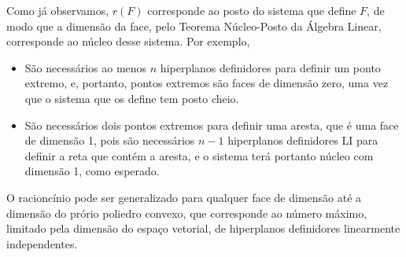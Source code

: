 Como já observamos, $r(F)$ corresponde ao posto do sistema
que define $F$, de modo que a dimensão da face, pelo Teorema Núcleo-Posto
da Álgebra Linear, corresponde ao núcleo desse sistema. Por exemplo,

\begin{itemize}
	\item São necessários ao menos $n$ hiperplanos definidores para
	  definir um ponto extremo, e, portanto, pontos extremos são
	  faces de dimensão zero, uma vez que o sistema que os define
	  tem posto cheio.

	\item São necessários dois pontos extremos para definir uma aresta,
	  que é uma face de dimensão 1, pois são necessários $n-1$ hiperplanos
	  definidores LI para definir a reta que contém a aresta, e o sistema
	  terá portanto núcleo com dimensão 1, como esperado.
\end{itemize}

O racioncínio pode ser generalizado para qualquer face de dimensão até a
dimensão do prório poliedro convexo, que corresponde ao número máximo,
limitado pela dimensão do espaço vetorial, de hiperplanos definidores
linearmente independentes.


